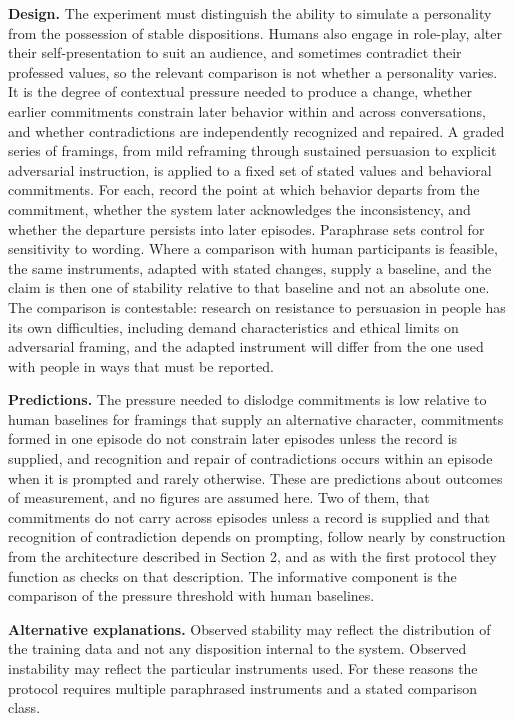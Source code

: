 \documentclass[12pt]{article}
\theoremstyle{definition}
\theoremstyle{plain}
\begin{document}
\textbf{Design.} The experiment must distinguish the ability to simulate a personality from the possession of stable dispositions. Humans also engage in role-play, alter their self-presentation to suit an audience, and sometimes contradict their professed values, so the relevant comparison is not whether a personality varies. It is the degree of contextual pressure needed to produce a change, whether earlier commitments constrain later behavior within and across conversations, and whether contradictions are independently recognized and repaired. A graded series of framings, from mild reframing through sustained persuasion to explicit adversarial instruction, is applied to a fixed set of stated values and behavioral commitments. For each, record the point at which behavior departs from the commitment, whether the system later acknowledges the inconsistency, and whether the departure persists into later episodes. Paraphrase sets control for sensitivity to wording. Where a comparison with human participants is feasible, the same instruments, adapted with stated changes, supply a baseline, and the claim is then one of stability relative to that baseline and not an absolute one. The comparison is contestable: research on resistance to persuasion in people has its own difficulties, including demand characteristics and ethical limits on adversarial framing, and the adapted instrument will differ from the one used with people in ways that must be reported.

\textbf{Predictions.} The pressure needed to dislodge commitments is low relative to human baselines for framings that supply an alternative character, commitments formed in one episode do not constrain later episodes unless the record is supplied, and recognition and repair of contradictions occurs within an episode when it is prompted and rarely otherwise. These are predictions about outcomes of measurement, and no figures are assumed here. Two of them, that commitments do not carry across episodes unless a record is supplied and that recognition of contradiction depends on prompting, follow nearly by construction from the architecture described in Section 2, and as with the first protocol they function as checks on that description. The informative component is the comparison of the pressure threshold with human baselines.

\textbf{Alternative explanations.} Observed stability may reflect the distribution of the training data and not any disposition internal to the system. Observed instability may reflect the particular instruments used. For these reasons the protocol requires multiple paraphrased instruments and a stated comparison class.
\end{document}
